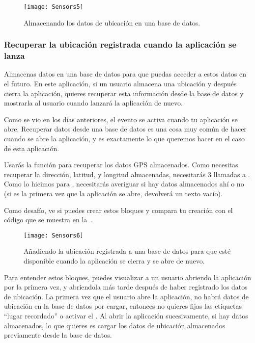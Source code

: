 \begin{figure}[H]
\vspace{3em}
\centering
\texttt{[image: Sensors5]}
\caption{Almacenando los datos de ubicación en una base de datos.}
\label{fig:Sensors5}
\end{figure}

\subsubsection*{Recuperar la ubicación registrada cuando la aplicación se lanza}

Almacenas datos en una base de datos para que puedas acceder a estos
datos en el futuro. En este aplicación, si un usuario almacena una
ubicación y después cierra la aplicación, quieres recuperar esta
información desde la base de datos y mostrarla al usuario cuando
lanzará la aplicación de nuevo.

Como se vio en los días anteriores, el evento
 se activa cuando tu aplicación se
abre. Recuperar datos desde una base de datos es una cosa muy común de
hacer cuando se abre la aplicación, y es exactamente lo que queremos
hacer en el caso de esta aplicación.

Usarás la función  para recuperar los datos
GPS almacenados. Como necesitas recuperar la dirección, latitud, y
longitud almacenadas, necesitarás 3 llamadas a . Como
lo hicimos para , necesitarás averiguar si
hay datos almacenados ahí o no (si es la primera vez que la aplicación
se abre,  devolverá un texto vacío).

Como desafío, ve si puedes crear estos bloques y compara tu creación
con el código que se muestra en la~.

\begin{figure}[H]
\vspace{3em}
\centering
\texttt{[image: Sensors6]}
\caption{Añadiendo la ubicación registrada a una base de datos para
  que esté disponible cuando la aplicación se cierra y se abre de
  nuevo.}
\label{fig:Sensors6}
\end{figure}

Para entender estos bloques, puedes visualizar a un usuario abriendo
la aplicación por la primera vez, y abriendola más tarde después de
haber registrado los datos de ubicación. La primera vez que el usuario
abre la aplicación, no habrá datos de ubicación en la base de datos
por cargar, entonces no quieres fijas las etiquetas ``lugar
recordado'' o activar el . Al
abrir la aplicación sucesivamente, si hay datos almacenados, lo que
quieres es cargar los datos de ubicación almacenados previamente desde
la base de datos.

